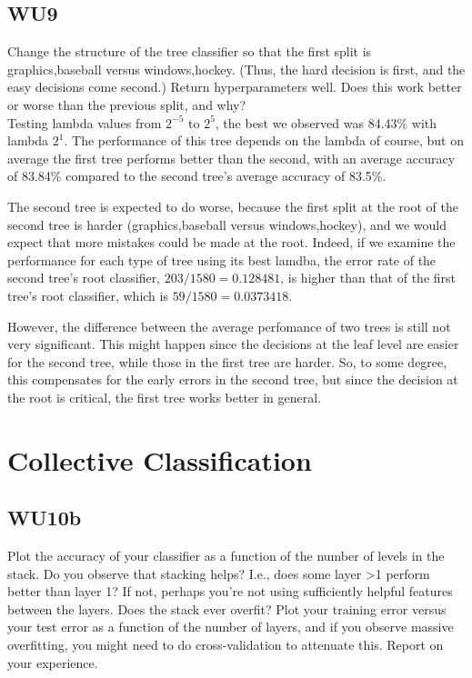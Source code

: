 \documentclass[a4paper,11pt]{article}
\begin{document}
\subsection{WU9}
\textsf{Change the structure of the tree classifier so that the first
  split is {graphics,baseball} versus {windows,hockey}. (Thus, the
  hard decision is first, and the easy decisions come second.) Return
  hyperparameters well. Does this work better or worse than the
  previous split, and why?}\\

Testing lambda values from $2^{-5}$ to $2^{5}$, 
the best we observed was 84.43\% with lambda $2^1$.
The performance of this tree depends on the lambda  of course, but on
average the first tree performs better than the second, with an average accuracy
of 83.84\% compared to the second tree's average accuracy of 83.5\%. 

The second tree is expected to do worse, because the first split at the root of 
the second tree is harder ({graphics,baseball} versus {windows,hockey}),
and we would expect that more mistakes could be made at the root. 
Indeed, if we examine the performance for each type of tree using its best lamdba,
the error rate of the second tree's root classifier,
$203 / 1580 = 0.128481$, is higher than that of the first 
tree's root classifier, which is $59 / 1580 = 0.0373418$.

However, the difference between the average perfomance of two trees is still
not very significant. This might happen since the decisions at the leaf level
are easier for the second tree, while those in the first tree are harder.
So, to some degree, this compensates for the early errors in the second tree,
but since the decision at the root is critical, the first tree works better in general.

\pagebreak
\section{Collective Classification}
\subsection{WU10b}
\textsf{Plot the accuracy of your classifier as a function
  of the number of levels in the stack. Do you observe that stacking
  helps? I.e., does some layer >1 perform better than layer 1? If not,
  perhaps you're not using sufficiently helpful features between the
  layers. Does the stack ever overfit? Plot your training error versus
  your test error as a function of the number of layers, and if you
  observe massive overfitting, you might need to do cross-validation
  to attenuate this. Report on your experience.}\\
\end{document}
